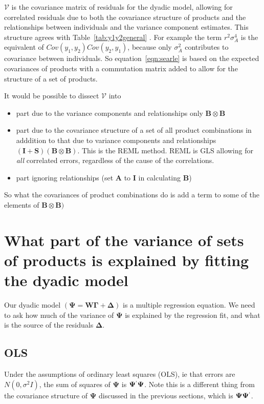 \documentclass[titlepage]{article}  %
\begin{document}
$\bm{\mathcal{V}}$ is the covariance matrix of residuals for the dyadic model, allowing for correlated residuals due to both the covariance structure of products and  the relationships between individuals and the variance component estimates.
 This structure agrees with Table~\ref{tab:y1y2general} . For example the term $r^{2}\sigma_{A}^{4}$ is the equivalent of $Cov(y_{1},y_{2})Cov(y_{2},y_{1})$, because only $\sigma^{2}_{A}$ contributes to covariance between individuals. So equation~\ref{eqn:searle} is based on the expected covariances of products with a commutation matrix added to allow for the structure of a set of products.

It would be possible to dissect $\bm{\mathcal{V}}$ into 
\begin{itemize}
\item part due to the variance components and relationships only $\bm{B} \otimes \bm{B}$
\item part due to the covariance structure of a set of all product combinations  in adddition to that due to variance components and relationships $(\bm{I} + \bm{S})(\bm{B} \otimes \bm{B}) $. This is the REML method. REML is GLS allowing for {\em all} correlated errors, regardless of the cause of the correlations.
\item part ignoring relationships (set $\bm{A}$ to $\bm{I}$ in calculating $\bm{B}$)
\end{itemize}
 
So what the covariances of product combinations do is add a  term  to some of the elements of $\bm{B} \otimes  \bm{B})$




\section{What part of the variance of sets of products is explained by fitting the dyadic model}


Our dyadic model $(\bm{\Psi} = \bm{W} \bm{\Gamma} + \bm{\Delta})$ is a multiple regression equation. We need to ask how much of the variance of $\bm{\Psi}$ is explained by the regression fit, and what is the source of the residuals $\bm{\Delta}$. 

\subsection{OLS}

Under the assumptions of ordinary least squares (OLS), ie that errors are $N(0,\sigma^{2}I)$,
the sum of squares of $\bm{\Psi}$ is $\bm{\Psi}^{`}\bm{\Psi}$. Note this is a different thing from the covariance structure of $\bm{\Psi}$ discussed in the previous sections, which is $\bm{\Psi}\bm{\Psi}^{`}$. 
\end{document}

